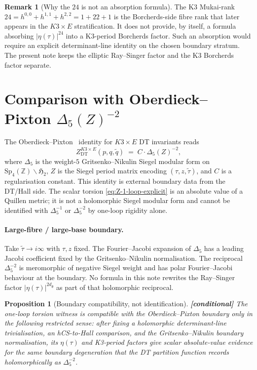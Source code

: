 \documentclass[11pt]{article}
\newtheorem{proposition}[theorem]{Proposition}
\theoremstyle{definition}
\newtheorem{remark}[theorem]{Remark}
\providecommand{\Z}{\mathbb{Z}}
\providecommand{\frakg}{\mathfrak{g}}
\providecommand{\ClaimStatusConditional}[1][]{\textbf{[conditional]}}
\begin{document}
\begin{remark}[Why the $24$ is not an absorption formula]
\label{rem:24-absorbed}
The K3 Mukai-rank $24 = h^{0,0} + h^{1,1} + h^{2,2} = 1 + 22 + 1$ is the
Borcherds-side fibre rank that later appears in the $K3\times E$
stratification. It does not provide, by itself, a formula absorbing
$|\eta(\tau)|^{24}$ into a K3-period Borcherds factor. Such an
absorption would require an explicit determinant-line identity on the
chosen boundary stratum. The present note keeps the elliptic
Ray--Singer factor and the K3 Borcherds factor separate.
\end{remark}

\section{Comparison with Oberdieck--Pixton $\Delta_5(Z)^{-2}$}
\label{sec:comparison-oberdieck-pixton}

The Oberdieck--Pixton~\cite{OberdieckPixton2018} identity for $K3\times E$
DT invariants reads
\begin{equation}
\label{eq:OP-identity}
Z^{K3\times E}_{\mathrm{DT}}(p,q,\tilde q) \;=\; C\cdot \Delta_5(Z)^{-2},
\end{equation}
where $\Delta_5$ is the weight-$5$ Gritsenko--Nikulin Siegel modular
form on $\mathrm{Sp}_4(\Z)\backslash\mathfrak{H}_2$, $Z$ is the Siegel
period matrix encoding $(\tau, z, \tilde\tau)$, and $C$ is a
regularisation constant. This identity is external boundary data from
the DT/Hall side. The scalar torsion
\eqref{eq:Z-1-loop-explicit} is an absolute value of a Quillen metric;
it is not a holomorphic Siegel modular form and cannot be identified
with $\Delta_5^{-1}$ or $\Delta_5^{-2}$ by one-loop rigidity alone.

\paragraph{Large-fibre / large-base boundary.} Take
$\tilde\tau\to i\infty$ with $\tau,z$ fixed. The Fourier--Jacobi
expansion of $\Delta_5$ has a leading Jacobi coefficient fixed by the
Gritsenko--Nikulin normalisation. The reciprocal $\Delta_5^{-2}$ is
meromorphic of negative Siegel weight and has polar Fourier--Jacobi
behaviour at the boundary. No formula in this note rewrites the
Ray--Singer factor $|\eta(\tau)|^{2d_\frakg}$ as part of that
holomorphic reciprocal.

\begin{proposition}[Boundary compatibility, not identification]
\label{prop:compatibility-leading-order}
\ClaimStatusConditional{}
The one-loop torsion witness is compatible with the
Oberdieck--Pixton boundary only in the following restricted sense:
after fixing a holomorphic determinant-line trivialisation, an
hCS-to-Hall comparison, and the Gritsenko--Nikulin boundary
normalisation, its $\eta(\tau)$ and K3-period factors give scalar
absolute-value evidence for the same boundary degeneration that the DT
partition function records holomorphically as $\Delta_5^{-2}$.
\end{proposition}
\end{document}
